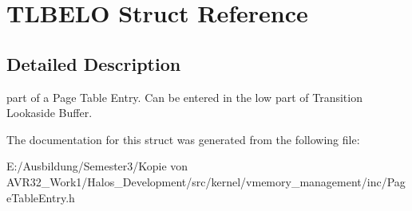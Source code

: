 \hypertarget{struct_t_l_b_e_l_o}{
\section{TLBELO Struct Reference}
\label{struct_t_l_b_e_l_o}
}


\subsection{Detailed Description}
part of a Page Table Entry. Can be entered in the low part of Transition Lookaside Buffer. 

The documentation for this struct was generated from the following file:\begin{CompactItemize}
\item 
E:/Ausbildung/Semester3/Kopie von AVR32\_\-Work1/Halos\_\-Development/src/kernel/vmemory\_\-management/inc/PageTableEntry.h\end{CompactItemize}
